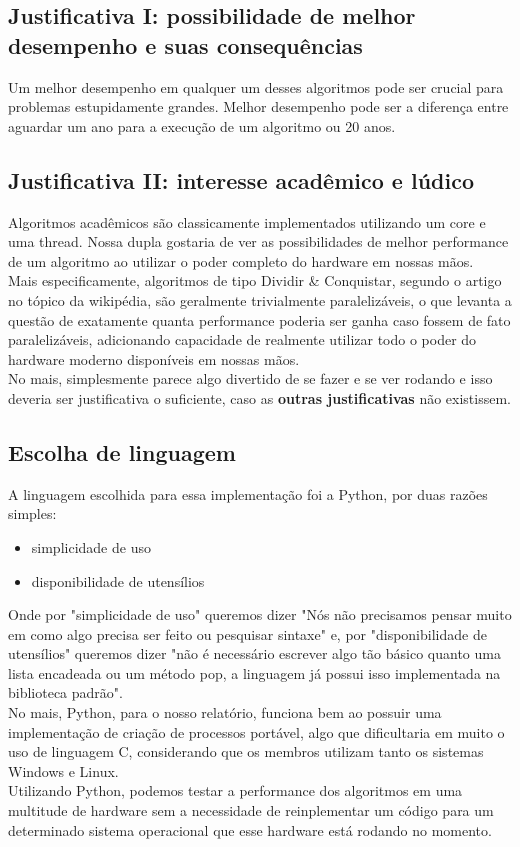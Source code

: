 \documentclass{article}
\begin{document}
\subsection{Justificativa I: possibilidade de melhor desempenho e suas consequências}
Um melhor desempenho em qualquer um desses algoritmos pode ser crucial para problemas estupidamente grandes. Melhor desempenho pode ser a diferença entre aguardar um ano para a execução de um algoritmo ou 20 anos. 

\subsection{Justificativa II: interesse acadêmico e lúdico}
Algoritmos acadêmicos são classicamente implementados utilizando um core e uma thread. Nossa dupla gostaria de ver as possibilidades de melhor performance de um algoritmo ao utilizar o poder completo do hardware em nossas mãos.\\
Mais especificamente, algoritmos de tipo Dividir \& Conquistar, segundo o artigo no tópico da wikipédia, são geralmente trivialmente paralelizáveis, o que levanta a questão de exatamente quanta performance poderia ser ganha caso fossem de fato paralelizáveis, adicionando capacidade de realmente utilizar todo o poder do hardware moderno disponíveis em nossas mãos.\\
No mais, simplesmente parece algo divertido de se fazer e se ver rodando e isso deveria ser justificativa o suficiente, caso as \textbf{outras justificativas} não existissem.

\subsection{Escolha de linguagem}
A linguagem escolhida para essa implementação foi a Python, por duas razões simples:
\begin{itemize}
    \item simplicidade de uso
    \item disponibilidade de utensílios
\end{itemize}
Onde por "simplicidade de uso" queremos dizer "Nós não precisamos pensar muito em como algo precisa ser feito ou pesquisar sintaxe" e, por "disponibilidade de utensílios" queremos dizer "não é necessário escrever algo tão básico quanto uma lista encadeada ou um método pop, a linguagem já possui isso implementada na biblioteca padrão".\\
No mais, Python, para o nosso relatório, funciona bem ao possuir uma implementação de criação de processos portável, algo que dificultaria em muito o uso de linguagem C, considerando que os membros utilizam tanto os sistemas Windows e Linux.\\
Utilizando Python, podemos testar a performance dos algoritmos em uma multitude de hardware sem a necessidade de reinplementar um código para um determinado sistema operacional que esse hardware está rodando no momento.
\end{document}
